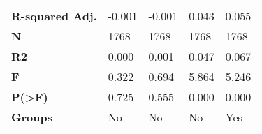 \begin{tabular}{lllll}
\textbf{R-squared Adj. } &         -0.001 &         -0.001 &          0.043 &          0.055 \\
\textbf{N              } &           1768 &           1768 &           1768 &           1768 \\
\textbf{R2             } &          0.000 &          0.001 &          0.047 &          0.067 \\
\textbf{F              } &          0.322 &          0.694 &          5.864 &          5.246 \\
\textbf{P(>F)          } &          0.725 &          0.555 &          0.000 &          0.000 \\
\textbf{Groups         } &             No &             No &             No &            Yes \\
\bottomrule
\end{tabular}
